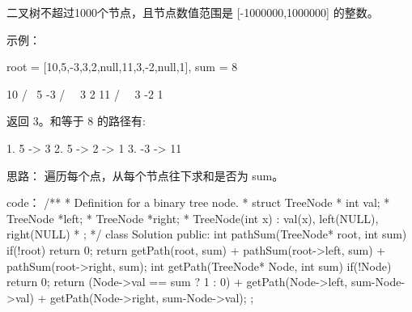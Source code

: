 二叉树不超过1000个节点，且节点数值范围是 [-1000000,1000000] 的整数。

示例：

root = [10,5,-3,3,2,null,11,3,-2,null,1], sum = 8

      10
     /  \
    5   -3
   / \    \
  3   2   11
 / \   \
3  -2   1

返回 3。和等于 8 的路径有:

1.  5 -> 3
2.  5 -> 2 -> 1
3.  -3 -> 11






















思路：
遍历每个点，从每个节点往下求和是否为 sum。




















code：
/**
 * Definition for a binary tree node.
 * struct TreeNode {
 *     int val;
 *     TreeNode *left;
 *     TreeNode *right;
 *     TreeNode(int x) : val(x), left(NULL), right(NULL) {}
 * };
 */
class Solution {
public:
    int pathSum(TreeNode* root, int sum) {
        if(!root) return 0;
        return getPath(root, sum) + pathSum(root->left, sum) + pathSum(root->right, sum);
    }
    int getPath(TreeNode* Node, int sum)
    {
        if(!Node) return 0;
        return (Node->val == sum ? 1 : 0) + getPath(Node->left, sum-Node->val) + getPath(Node->right, sum-Node->val);
    }
};